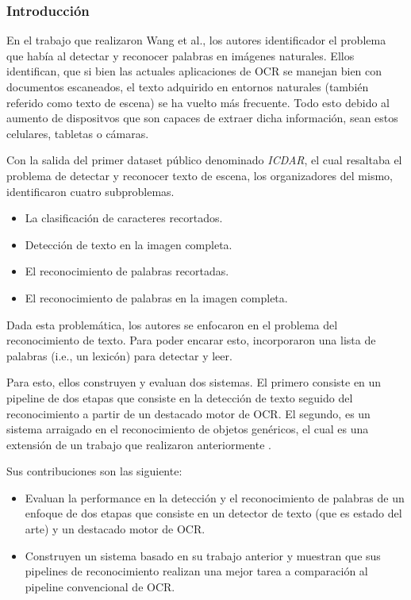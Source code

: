 \subsubsection{Introducción}

	En el trabajo que realizaron Wang et al., los autores identificador el problema que había al detectar y reconocer palabras en imágenes naturales. Ellos identifican, que si bien las actuales aplicaciones de OCR se manejan bien con documentos escaneados, el texto adquirido en entornos naturales (también referido como texto de escena) se ha vuelto más frecuente. Todo esto debido al aumento de dispositvos que son capaces de extraer dicha información, sean estos celulares, tabletas o cámaras.
	
	Con la salida del primer dataset público denominado \textit{ICDAR}, el cual resaltaba el problema de detectar y reconocer texto de escena, los organizadores del mismo, identificaron cuatro subproblemas.
	\begin{itemize}
		\item La clasificación de caracteres recortados.
		\item Detección de texto en la imagen completa.
		\item El reconocimiento de palabras recortadas.
		\item El reconocimiento de palabras en la imagen completa.
	\end{itemize}
	
	Dada esta problemática, los autores se enfocaron en el problema del reconocimiento de texto. Para poder encarar esto, incorporaron una lista de palabras (i.e., un lexicón) para detectar y leer.
		
	Para esto, ellos construyen y evaluan dos sistemas. El primero consiste en un pipeline de dos etapas que consiste en la detección de texto seguido del reconocimiento a partir de un destacado motor de OCR. El segundo, es un sistema arraigado en el reconocimiento de objetos genéricos, el cual es una extensión de un trabajo que realizaron anteriormente \cite{WB10}.
	
	Sus contribuciones son las siguiente:
		\begin{itemize}
			\item Evaluan la performance en la detección y el reconocimiento de palabras de un enfoque de dos etapas que consiste en un detector de texto (que es estado del arte) y un destacado motor de OCR.
			\item Construyen un sistema basado en su trabajo anterior \cite{WB10} y muestran que sus pipelines de reconocimiento realizan una mejor tarea a comparación al pipeline convencional de OCR.
		\end{itemize}